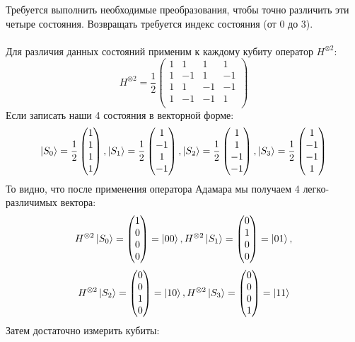 \documentclass[12pt]{article}
\begin{document}
	Требуется выполнить необходимые преобразования, чтобы точно различить эти четыре состояния. Возвращать требуется индекс состояния (от $0$ до $3$). 
	\\\\
	Для различия данных состояний применим к каждому кубиту оператор $H^{\otimes2}$:
	$$
	H^{\otimes2} = \frac{1}{2}
	\begin{pmatrix}
		1 & 1 & 1 & 1\\
		1 & -1 & 1 & -1 \\
		1 & 1 & -1 & -1\\
		1 & -1 & -1 & 1\\
	\end{pmatrix}
	$$
	Если записать наши 4 состояния в векторной форме:
	$$
	\Ket{S_0} = \frac{1}{2} \begin{pmatrix} 1\\1\\1\\1\end{pmatrix},
	\Ket{S_1} = \frac{1}{2} \begin{pmatrix} 1\\-1\\1\\-1\end{pmatrix},
	\Ket{S_2} = \frac{1}{2} \begin{pmatrix} 1\\1\\-1\\-1\end{pmatrix},
	\Ket{S_3} = \frac{1}{2} \begin{pmatrix} 1\\-1\\-1\\1\end{pmatrix}
	$$
	То видно, что после применения оператора Адамара мы получаем 4 легко-различимых вектора:
	$$
	H^{\otimes2} \Ket{S_0} = \begin{pmatrix} 1\\0\\0\\0\end{pmatrix} = \Ket{00},
	H^{\otimes2} \Ket{S_1} = \begin{pmatrix} 0\\1\\0\\0\end{pmatrix} = \Ket{01},
	$$
	$$
	H^{\otimes2} \Ket{S_2} = \begin{pmatrix} 0\\0\\1\\0\end{pmatrix} = \Ket{10},
	H^{\otimes2} \Ket{S_3} = \begin{pmatrix} 0\\0\\0\\1\end{pmatrix} = \Ket{11}
	$$
	Затем достаточно измерить кубиты:
	
\end{document}

